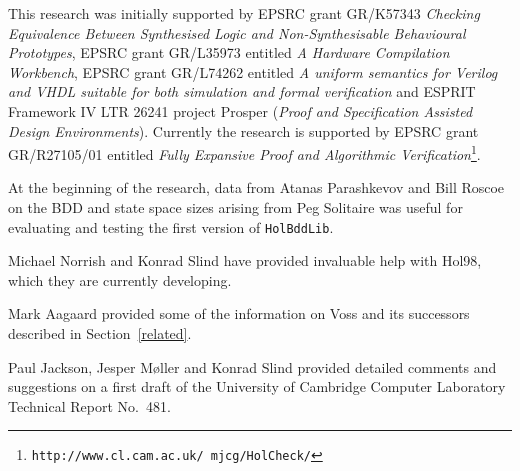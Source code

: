 \documentclass[12pt]{article}
\renewcommand{\t}[1]{\mbox{\tt #1}}
\newcommand\Hol{Hol98\xspace}
\begin{document}
This research was initially supported by EPSRC grant
GR/K57343 {\em Checking Equivalence Between Synthesised Logic and
Non-Synthesisable Behavioural Prototypes}, EPSRC grant GR/L35973
entitled {\it A Hardware Compilation Workbench\/}, EPSRC grant
GR/L74262 entitled {\it A uniform semantics for Verilog and VHDL
suitable for both simulation and formal verification\/} and ESPRIT
Framework IV LTR 26241 project Prosper ({\em Proof and Specification
Assisted Design Environments}). Currently the research is supported by
EPSRC grant GR/R27105/01 entitled {\it Fully Expansive Proof and
Algorithmic Verification\/}\footnote{\texttt{http://www.cl.cam.ac.uk/~mjcg/HolCheck/}}.

At the beginning of the research, data from Atanas Parashkevov
and Bill Roscoe on the BDD and state space sizes arising from Peg Solitaire
was useful for evaluating and testing the first version of \t{HolBddLib}.

Michael Norrish and Konrad Slind have provided invaluable help with
\Hol, which they are currently developing. 

Mark Aagaard provided some
of the information on Voss and its successors described in
Section~\ref{related}.

Paul Jackson, Jesper M\o{}ller and Konrad Slind provided detailed
comments and suggestions on a first draft of the University of
Cambridge Computer Laboratory Technical Report No.~481.

  

\clearpage
{}
\printindex[MLty]

\clearpage
{}
\printindex[MLbn]
\end{document}
